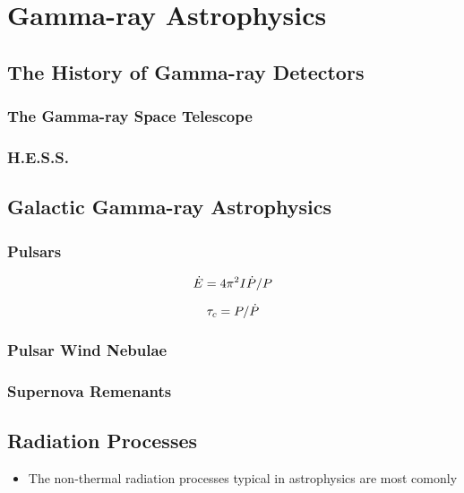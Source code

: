
\chapter{Gamma-ray Astrophysics}

\section{The History of Gamma-ray Detectors}
\subsection{The \fermi Gamma-ray Space Telescope}
\subsection{H.E.S.S.}

\section{Galactic Gamma-ray Astrophysics}
\subsection{Pulsars}

\begin{equation}
  \dot{E} = 
  4\pi^2 I \dot{P}/P
\end{equation}

\begin{equation}
  \tau_c = P/\dot{P}
\end{equation}


\subsection{Pulsar Wind Nebulae}
\subsection{Supernova Remenants}

\section{Radiation Processes}

\begin{itemize}
  \item The non-thermal radiation processes typical
    in astrophysics are most comonly
\end{itemize}

